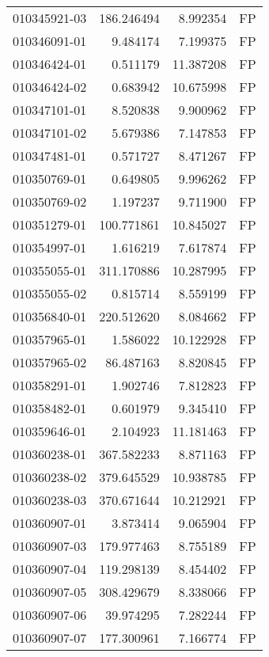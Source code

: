 \begin{tabular}{lrrl}
010345921-03 &  186.246494 &       8.992354 &   FP \\
010346091-01 &    9.484174 &       7.199375 &   FP \\
010346424-01 &    0.511179 &      11.387208 &   FP \\
010346424-02 &    0.683942 &      10.675998 &   FP \\
010347101-01 &    8.520838 &       9.900962 &   FP \\
010347101-02 &    5.679386 &       7.147853 &   FP \\
010347481-01 &    0.571727 &       8.471267 &   FP \\
010350769-01 &    0.649805 &       9.996262 &   FP \\
010350769-02 &    1.197237 &       9.711900 &   FP \\
010351279-01 &  100.771861 &      10.845027 &   FP \\
010354997-01 &    1.616219 &       7.617874 &   FP \\
010355055-01 &  311.170886 &      10.287995 &   FP \\
010355055-02 &    0.815714 &       8.559199 &   FP \\
010356840-01 &  220.512620 &       8.084662 &   FP \\
010357965-01 &    1.586022 &      10.122928 &   FP \\
010357965-02 &   86.487163 &       8.820845 &   FP \\
010358291-01 &    1.902746 &       7.812823 &   FP \\
010358482-01 &    0.601979 &       9.345410 &   FP \\
010359646-01 &    2.104923 &      11.181463 &   FP \\
010360238-01 &  367.582233 &       8.871163 &   FP \\
010360238-02 &  379.645529 &      10.938785 &   FP \\
010360238-03 &  370.671644 &      10.212921 &   FP \\
010360907-01 &    3.873414 &       9.065904 &   FP \\
010360907-03 &  179.977463 &       8.755189 &   FP \\
010360907-04 &  119.298139 &       8.454402 &   FP \\
010360907-05 &  308.429679 &       8.338066 &   FP \\
010360907-06 &   39.974295 &       7.282244 &   FP \\
010360907-07 &  177.300961 &       7.166774 &   FP \\

\end{tabular}
